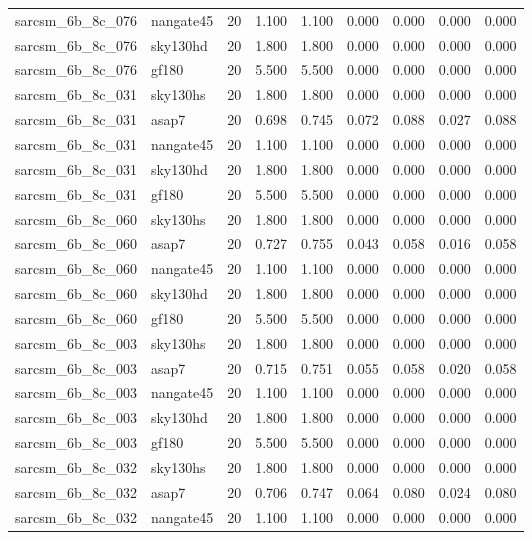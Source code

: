 \begin{tabular}{llrrrrrrr}
sarcsm\_6b\_8c\_076 & nangate45 & 20 & 1.100 & 1.100 & 0.000 & 0.000 & 0.000 & 0.000 \\
sarcsm\_6b\_8c\_076 & sky130hd & 20 & 1.800 & 1.800 & 0.000 & 0.000 & 0.000 & 0.000 \\
sarcsm\_6b\_8c\_076 & gf180 & 20 & 5.500 & 5.500 & 0.000 & 0.000 & 0.000 & 0.000 \\
sarcsm\_6b\_8c\_031 & sky130hs & 20 & 1.800 & 1.800 & 0.000 & 0.000 & 0.000 & 0.000 \\
sarcsm\_6b\_8c\_031 & asap7 & 20 & 0.698 & 0.745 & 0.072 & 0.088 & 0.027 & 0.088 \\
sarcsm\_6b\_8c\_031 & nangate45 & 20 & 1.100 & 1.100 & 0.000 & 0.000 & 0.000 & 0.000 \\
sarcsm\_6b\_8c\_031 & sky130hd & 20 & 1.800 & 1.800 & 0.000 & 0.000 & 0.000 & 0.000 \\
sarcsm\_6b\_8c\_031 & gf180 & 20 & 5.500 & 5.500 & 0.000 & 0.000 & 0.000 & 0.000 \\
sarcsm\_6b\_8c\_060 & sky130hs & 20 & 1.800 & 1.800 & 0.000 & 0.000 & 0.000 & 0.000 \\
sarcsm\_6b\_8c\_060 & asap7 & 20 & 0.727 & 0.755 & 0.043 & 0.058 & 0.016 & 0.058 \\
sarcsm\_6b\_8c\_060 & nangate45 & 20 & 1.100 & 1.100 & 0.000 & 0.000 & 0.000 & 0.000 \\
sarcsm\_6b\_8c\_060 & sky130hd & 20 & 1.800 & 1.800 & 0.000 & 0.000 & 0.000 & 0.000 \\
sarcsm\_6b\_8c\_060 & gf180 & 20 & 5.500 & 5.500 & 0.000 & 0.000 & 0.000 & 0.000 \\
sarcsm\_6b\_8c\_003 & sky130hs & 20 & 1.800 & 1.800 & 0.000 & 0.000 & 0.000 & 0.000 \\
sarcsm\_6b\_8c\_003 & asap7 & 20 & 0.715 & 0.751 & 0.055 & 0.058 & 0.020 & 0.058 \\
sarcsm\_6b\_8c\_003 & nangate45 & 20 & 1.100 & 1.100 & 0.000 & 0.000 & 0.000 & 0.000 \\
sarcsm\_6b\_8c\_003 & sky130hd & 20 & 1.800 & 1.800 & 0.000 & 0.000 & 0.000 & 0.000 \\
sarcsm\_6b\_8c\_003 & gf180 & 20 & 5.500 & 5.500 & 0.000 & 0.000 & 0.000 & 0.000 \\
sarcsm\_6b\_8c\_032 & sky130hs & 20 & 1.800 & 1.800 & 0.000 & 0.000 & 0.000 & 0.000 \\
sarcsm\_6b\_8c\_032 & asap7 & 20 & 0.706 & 0.747 & 0.064 & 0.080 & 0.024 & 0.080 \\
sarcsm\_6b\_8c\_032 & nangate45 & 20 & 1.100 & 1.100 & 0.000 & 0.000 & 0.000 & 0.000 \\

\end{tabular}
